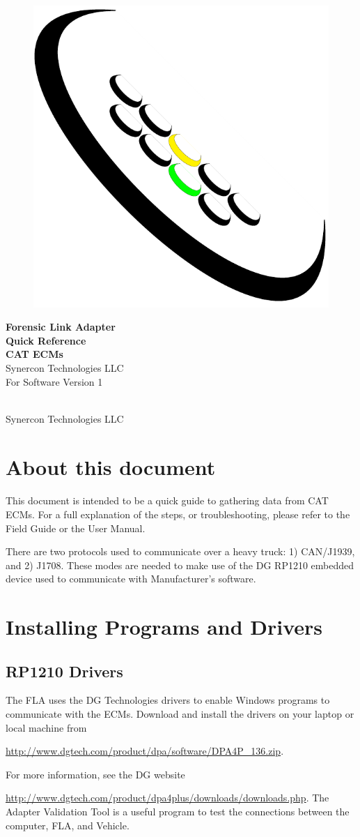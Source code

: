 \documentclass[11pt]{article}
\newcommand*{\titleGP}{\begingroup %
\centering %
\vspace*{\baselineskip} %
\begin{figure}[tbph]
\centering
\includegraphics[width=0.15\linewidth]{../../media/logos/synercon_logo_v3_only}
\end{figure}
{\Huge \textbf{Forensic Link Adapter \\Quick Reference}}\\[2\baselineskip] %
{\Huge \textbf{CAT ECMs}}\\[2\baselineskip] %
{\Huge Synercon Technologies LLC}\\[2\baselineskip]
{\Large For Software Version 1}\\[3cm]

\tableofcontents
\vfill %


\textcopyright {\scshape 2015} \\[0.3\baselineskip] %
Synercon Technologies LLC

\endgroup}
\begin{document}







\titleGP %

\newpage
\section{About this document}
\paragraph{  }
This document is intended to be a quick guide to gathering data from CAT ECMs. For a full explanation of the steps, or troubleshooting, please refer to the Field Guide or the User Manual.

There are two protocols used to communicate over a heavy truck: 1)
CAN/J1939, and 2) J1708. These modes are needed to make use of the
DG RP1210 embedded device used to communicate with Manufacturer\textquoteright s
software. 


\section{Installing Programs and Drivers}


\subsection{\label{sub:RP1210-Drivers}RP1210 Drivers}

The FLA uses the DG Technologies drivers to enable Windows programs
to communicate with the ECMs. Download and install the drivers on
your laptop or local machine from

\href{http://www.dgtech.com/product/dpa/software/DPA4P_136.zip}{http://www.dgtech.com/product/dpa/software/DPA4P\_{}136.zip}.

For more information, see the DG website

\href{http://www.dgtech.com/product/dpa4plus/downloads/downloads.php}{http://www.dgtech.com/product/dpa4plus/downloads/downloads.php}.
The Adapter Validation Tool is a useful program to test the connections
between the computer, FLA, and Vehicle.
\end{document}
